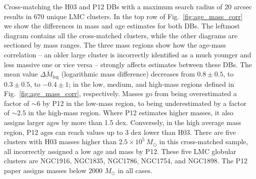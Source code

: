 \documentclass{aa}
\begin{document}
Cross-matching the H03 and P12 DBs with a maximum search radius of 20
arcsec results in 670 unique LMC clusters.
In the top row of Fig.~\ref{fig:age_mass_corr} we show the differences
in mass and age estimates for both DBs. The leftmost diagram contains all the
cross-matched clusters, while the other diagrams are sectioned by mass
ranges. The three mass regions show how the age-mass correlation -- an older
large cluster is incorrectly identified as a much younger and less massive one
or vice versa -- strongly affects estimates between these DBs.\@
%
The mean value $\overline{\Delta M_{\log}}$ (logarithmic mass difference)
decreases from $0.8{\pm}0.5$, to $0.3{\pm}0.5$, to $-0.4{\pm}1$; in the
low, medium, and high-mass regions defined in Fig.~\ref{fig:age_mass_corr},
respectively. Masses go from being overestimated a
factor of ${\sim}6$ by P12 in the low-mass region, to being underestimated by a
factor of ${\sim}2.5$ in the high-mass region.
%
Where P12 estimates higher masses, it also assigns larger ages by more than 1.5
dex. Conversely, in the high average mass region, P12 ages can reach
values up to 3 dex lower than H03.
%
There are five clusters with H03 masses higher than
$2.5{\times}10^5\,M_{\odot}$ in this cross-matched sample, all incorrectly
assigned a low age and mass by P12. These five LMC globular clusters
are NGC1916, NGC1835, NGC1786, NGC1754, and NGC1898. The P12 paper assigns masses below
2000 $M_{\odot}$ in all cases.
%
\end{document}
